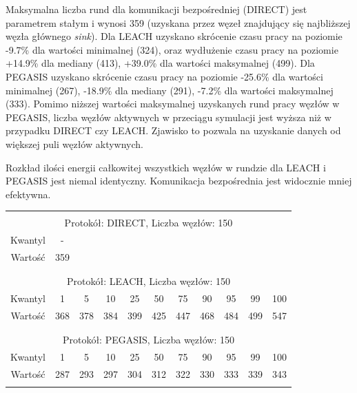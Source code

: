 \documentclass[a4paper,12pt,twoside,openany]{report}
\begin{document}
\par
Maksymalna liczba rund dla komunikacji bezpośredniej (DIRECT) jest parametrem stałym i wynosi 359 (uzyskana przez węzeł znajdujący się najbliższej węzła głównego \textit{sink}).
Dla LEACH uzyskano skrócenie czasu pracy na poziomie -9.7\% dla wartości minimalnej (324), oraz wydłużenie czasu pracy na poziomie +14.9\% dla mediany (413), +39.0\% dla wartości maksymalnej (499).
Dla PEGASIS uzyskano skrócenie czasu pracy na poziomie -25.6\% dla wartości minimalnej (267), -18.9\% dla mediany (291), -7.2\% dla wartości maksymalnej (333).
Pomimo niższej wartości maksymalnej uzyskanych rund pracy węzłów w PEGASIS, liczba węzłów aktywnych w przeciągu symulacji jest wyższa niż w przypadku DIRECT czy LEACH.
Zjawisko to pozwala na uzyskanie danych od większej puli węzłów aktywnych.
\par
Rozkład ilości energii całkowitej wszystkich węzłów w rundzie dla LEACH i PEGASIS jest niemal identyczny. Komunikacja bezpośrednia jest widocznie mniej efektywna.

\begin{longtable}{*{11}{c}}
\toprule \\*
\multicolumn{11}{c}{Protokół: DIRECT, Liczba węzłów: 150} \\*
Kwantyl	& -	\\*
Wartość	& 359	\\*
\midrule \\*
\\*
\multicolumn{11}{c}{Protokół: LEACH, Liczba węzłów: 150} \\*
Kwantyl	& 1	& 5	& 10	& 25	& 50	& 75	& 90	& 95	& 99	& 100	\\*
Wartość	& 368	& 378	& 384	& 399	& 425	& 447	& 468	& 484	& 499	& 547	\\*
\midrule \\*
\\*
\multicolumn{11}{c}{Protokół: PEGASIS, Liczba węzłów: 150} \\*
Kwantyl	& 1	& 5	& 10	& 25	& 50	& 75	& 90	& 95	& 99	& 100	\\*
Wartość	& 287	& 293	& 297	& 304	& 312	& 322	& 330	& 333	& 339	& 343	\\*
\bottomrule \\*
\end{longtable}
\end{document}
